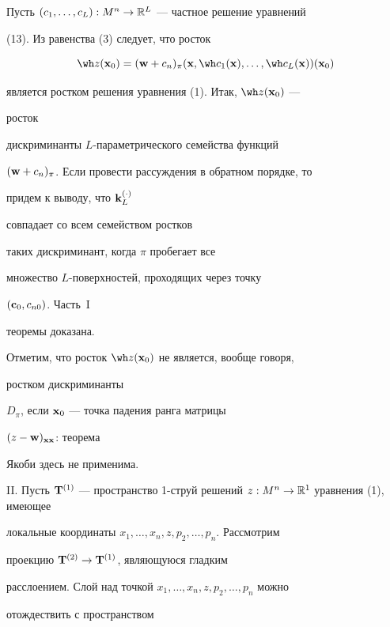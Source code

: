 Пусть $(c_1,\dotsc,c_L):M^n\to\Bbb R^L$ --- частное решение уравнений


(13). Из равенства (3) следует, что росток


\begin{equation}


\wh z(\bold x_0)=(\bold w+c_n)_\pi


(\bold x,\wh c_1(\bold x),\dotsc,\wh c_L(\bold x))(\bold x_0)


\end{equation}


является ростком решения уравнения (1). Итак, $\wh z(\bold x_0)$ ---


росток


дискриминанты $L$-парамет\-ри\-ческого семейства функций


$(\bold w+c_n)_\pi$. Если провести рассуждения в обратном порядке, то


придем к выводу, что $\bold k^{(\cdot)}_L$


совпадает со всем семейством ростков


таких дискриминант, когда $\pi$ пробегает все


множество $L$-поверхностей, проходящих через точку


$(\bold c_0,c_{n0})$. Часть~I


теоремы доказана.





Отметим, что росток $\wh z(\bold x_0)$ не является, вообще говоря,


ростком дискриминанты


$D_\pi$, если $\bold x_0$ --- точка падения ранга матрицы


$(z-\bold w)_{\bold x\bold x}$: теорема


Якоби здесь не применима.


\medskip





II. Пусть $\bold T^{(1)}$ --- пространство 1-струй решений $z:M^n\to\Bbb


R^1$ уравнения (1), имеющее


локальные координаты $x_1,\dotsc,x_n,z,p_2,\dotsc,p_n$. Рассмотрим


проекцию $\bold T^{(2)}\to\bold T^{(1)}$, являющуюся гладким


расслоением. Слой над точкой $x_1,\dotsc,x_n,z,p_2,\dotsc,p_n$ можно


отождествить с пространством



